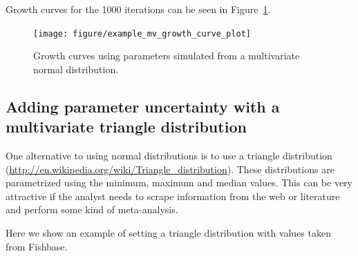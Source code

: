 \documentclass[a4paper,english,10pt]{article}\usepackage[]{graphicx}\usepackage[]{color}
\newenvironment{knitrout}{}{} %
\begin{document}
Growth curves for the 1000 iterations can be seen in Figure~\ref{fig:plot_mv_growth}.

\begin{figure}[h]
\begin{knitrout}
\color{fgcolor}

{\centering \texttt{[image: figure/example\_mv\_growth\_curve\_plot]} 

}



\end{knitrout}

\caption{Growth curves using parameters simulated from a multivariate normal distribution.}
\label{fig:plot_mv_growth}
\end{figure}

\subsection{Adding parameter uncertainty with a multivariate triangle distribution}
\label{sec:growth_triangle_cop}

One alternative to using normal distributions is to use a triangle distribution (\url{http://en.wikipedia.org/wiki/Triangle_distribution}). These distributions are parametrized using the minimum, maximum and median values. This can be very attractive if the analyst needs to scrape information from the web or literature and perform some kind of meta-analysis.

Here we show an example of setting a triangle distribution with values taken from Fishbase.
\end{document}
